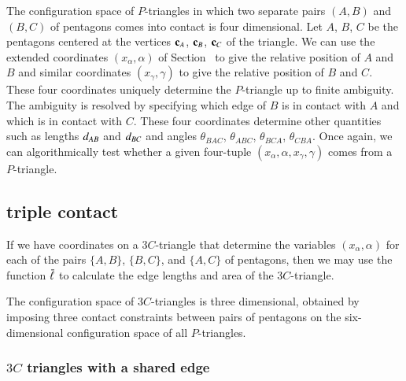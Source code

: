 
The configuration space of $P$-triangles in which two separate pairs
$(A,B)$ and $(B,C)$ of pentagons comes into contact is four
dimensional.  Let $A$, $B$, $C$ be the pentagons centered at the
vertices ${\mathbf c}_A$, ${\mathbf c}_B$, ${\mathbf c}_C$ of the triangle.  We can use the
extended coordinates $(x_\alpha,\alpha)$ of Section~
to give the relative position of $A$ and $B$ and similar coordinates
$(x_\gamma,\gamma)$ to give the relative position of $B$ and $C$.
These four coordinates uniquely determine the $P$-triangle up to
finite ambiguity.  The ambiguity is resolved by specifying which edge
of $B$ is in contact with $A$ and which is in contact with $C$.  These
four coordinates determine other quantities such as lengths $d_{AB}$
and $d_{BC}$ and angles $\theta_{BAC}$, $\theta_{ABC}$,
$\theta_{BCA}$, $\theta_{CBA}$.  Once again, we can algorithmically
test whether a given four-tuple $(x_\alpha,\alpha,x_\gamma,\gamma)$
comes from a $P$-triangle.


\subsection{triple contact}

If we have coordinates on a $3C$-triangle that determine the variables
$(x_\alpha,\alpha)$ for each of the pairs $\{A,B\}$, $\{B,C\}$, and $\{A,C\}$
of pentagons, then we may use the function $\bar\ell$ to calculate the edge
lengths and area of the $3C$-triangle.

The configuration space of $3C$-triangles is three dimensional,
obtained by imposing three contact constraints between pairs of
pentagons on the six-dimensional configuration space of all
$P$-triangles.

\subsubsection{$3C$ triangles with a shared edge}\label{sec:shared}

